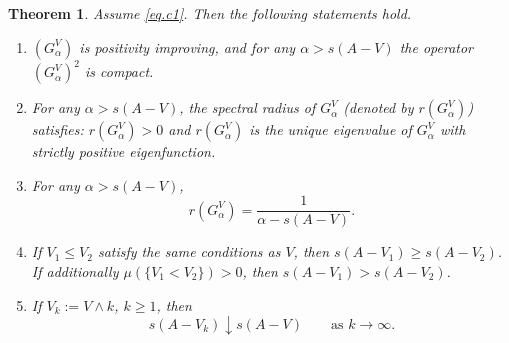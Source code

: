 \documentclass[11pt,a4paper,reqno]{amsart}
\newtheorem{theorem}{\bf Theorem}[section]
\theoremstyle{definition}
\numberwithin{equation}{section}
\begin{document}
\begin{theorem}
\label{th.pert1}
Assume \eqref{eq.c1}. Then the following statements hold.
\begin{enumerate}
\item[(i)] $(G^V_\alpha)$ is positivity improving, and 
  for any $\alpha>s(A-V)$ the operator  $(G^V_\alpha)^2$ is compact.
\item[(ii)] For any $\alpha>s(A-V)$, the spectral radius of $G^V_\alpha$ (denoted by $r(G^V_\alpha)$) satisfies:
$r(G^V_\alpha)>0$ and $r(G^V_\alpha)$ is the unique eigenvalue of $G^V_\alpha$
with strictly positive eigenfunction.
\item[(iii)] For any $\alpha>s(A-V)$, 
\[
r(G^V_\alpha)=\frac{1}{\alpha-s(A-V)}.
\]
\item[(iv)]  If $V_1\le V_2$ satisfy the same conditions as $V$, then $s(A-V_1)\ge s(A-V_2)$. 
If additionally $\mu(\{V_1<V_2\})>0$, then $s(A-V_1)>s(A-V_2)$.
\item[(v)] If $V_k:=V\wedge k$, $k\geq1$, then
\[
s(A-V_k)\downarrow s(A-V)
\qquad\text{as }k\to\infty.
\]
\end{enumerate}
\end{theorem}
\end{document}
